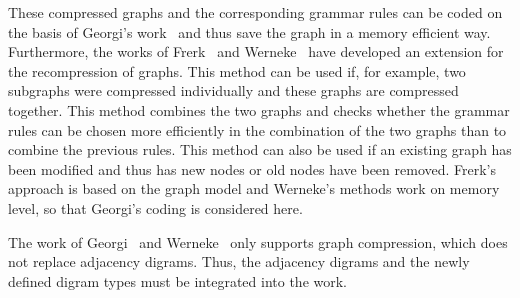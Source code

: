 \documentclass[a4paper]{scrartcl}
\begin{document}
These compressed graphs and the corresponding grammar rules can be coded on the basis of Georgi's work~\cite{georgi} and thus save the graph in a memory efficient way.
Furthermore, the works of Frerk~\cite{pfrerk} and Werneke~\cite{werneke} have developed an extension for the recompression of graphs. This method can be used if, for example, two subgraphs were compressed individually and these graphs are compressed together. This method combines the two graphs and checks whether the grammar rules can be chosen more efficiently in the combination of the two graphs than to combine the previous rules. This method can also be used if an existing graph has been modified and thus has new nodes or old nodes have been removed.
Frerk's approach is based on the graph model and Werneke's methods work on memory level, so that Georgi's coding is considered here.

The work of Georgi~\cite{georgi} and Werneke~\cite{werneke} only supports graph compression, which does not replace adjacency digrams. Thus, the adjacency digrams and the newly defined digram types must be integrated into the work.


\pagebreak
\printbibliography
\end{document}
